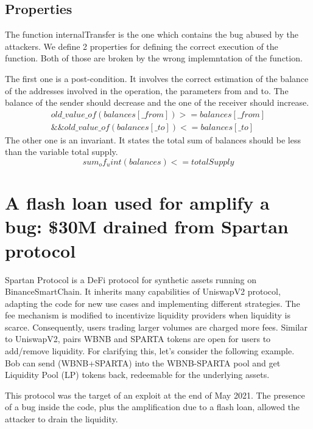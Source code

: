 \subsection{Properties}
The function internalTransfer is the one which contains the bug abused by the attackers. 
We define 2 properties for defining the correct execution of the function. Both of those are broken by 
the wrong implemntation of the function.

The first one is a post-condition. It involves the correct estimation of the balance of the addresses involved in the operation, the parameters from and to.
The balance of the sender should decrease and the one of the receiver should increase.
\begin{equation}
    \begin{split}
        old\_value\_of(balances[\_from])>=balances[\_from] \\
        \&\&old\_value\_of(balances[\_to])<=balances[\_to]
    \end{split}
\end{equation}
The other one is an invariant. It states the total sum of balances should be less than the variable total supply. 
\begin{equation}
    sum_of_uint(balances) <= totalSupply
\end{equation}


\section{A flash loan used for amplify a bug: \$30M  drained from Spartan protocol}   
\label{sec:Exploits:Spartan}
Spartan Protocol is a DeFi protocol for synthetic assets running on BinanceSmartChain. 
It inherits many capabilities of UniswapV2 protocol, adapting the code for new use cases and implementing different strategies. 
The fee mechanism is modified to incentivize liquidity providers when liquidity is scarce. Consequently, users trading larger 
volumes are charged more fees. Similar to UniswapV2, pairs WBNB and SPARTA tokens are open for users to add/remove liquidity. 
For clarifying this, let's consider the following example. Bob can send (WBNB+SPARTA) into the WBNB-SPARTA pool and get Liquidity Pool (LP) tokens back, 
redeemable for the underlying assets.

This protocol was the target of an exploit at the end of May 2021.
The presence of a bug inside the code, plus the amplification due to a flash loan, allowed the attacker to drain the liquidity.

